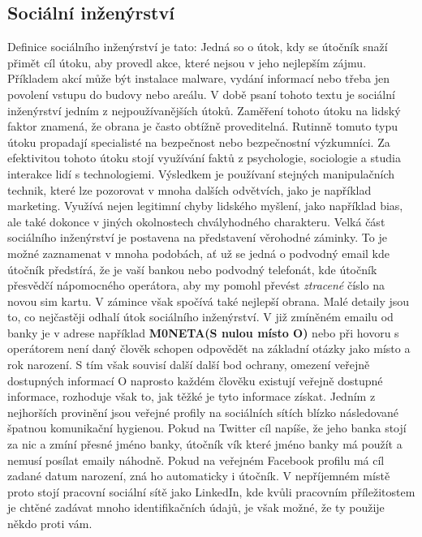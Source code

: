 \subsection{Sociální inženýrství}\label{subsec:socialni-inzenyrstvi}
Definice sociálního inženýrství je tato:
Jedná so o útok, kdy se útočník snaží přimět cíl útoku, aby provedl akce, které nejsou v jeho nejlepším zájmu.
Příkladem akcí může být instalace malware, vydání informací nebo třeba jen povolení vstupu do budovy nebo areálu.
V době psaní tohoto textu je sociální inženýrství jedním z nejpoužívanějších útoků.
Zaměření tohoto útoku na lidský faktor znamená, že obrana je často obtížně proveditelná.
Rutinně tomuto typu útoku propadají specialisté na bezpečnost nebo bezpečnostní výzkumníci.
Za efektivitou tohoto útoku stojí využívání faktů z psychologie, sociologie a studia interakce lidí s technologiemi.
Výsledkem je používaní stejných manipulačních technik, které lze pozorovat v mnoha dalších odvětvích, jako je například marketing.
Využívá nejen legitimní chyby lidského myšlení, jako například bias, ale také dokonce v jiných okolnostech chvályhodného charakteru.
Velká část sociálního inženýrství je postavena na představení věrohodné záminky.
To je možné zaznamenat v mnoha podobách, ať už se jedná o podvodný email kde útočník předstírá, že je vaší bankou nebo podvodný telefonát, kde útočník přesvědčí nápomocného operátora, aby my pomohl převést \textit{ztracené} číslo na novou sim kartu.
V zámince však spočívá také nejlepší obrana.
Malé detaily jsou to, co nejčastěji odhalí útok sociálního inženýrství.
V již zmíněném emailu od banky je v adrese například \textbf{M0NETA(S nulou místo O)} nebo při hovoru s operátorem není daný člověk schopen odpovědět na základní otázky jako místo a rok narození.
S tím však souvisí další další bod ochrany, omezení veřejně dostupných informací
O naprosto každém člověku existují veřejně dostupné informace, rozhoduje však to, jak těžké je tyto informace získat.
Jedním z nejhorších provinění jsou veřejné profily na sociálních sítích blízko následované špatnou komunikační hygienou.
Pokud na Twitter cíl napíše, že jeho banka stojí za nic a zmíní přesné jméno banky, útočník vík které jméno banky má použít a nemusí posílat emaily náhodně.
Pokud na veřejném Facebook profilu má cíl zadané datum narození, zná ho automaticky i útočník.
V nepříjemném místě proto stojí pracovní sociální sítě jako LinkedIn, kde kvůli pracovním příležitostem je chtěné zadávat mnoho identifikačních údajů, je však možné, že ty použije někdo proti vám.\cite{moje_bakalarka}


